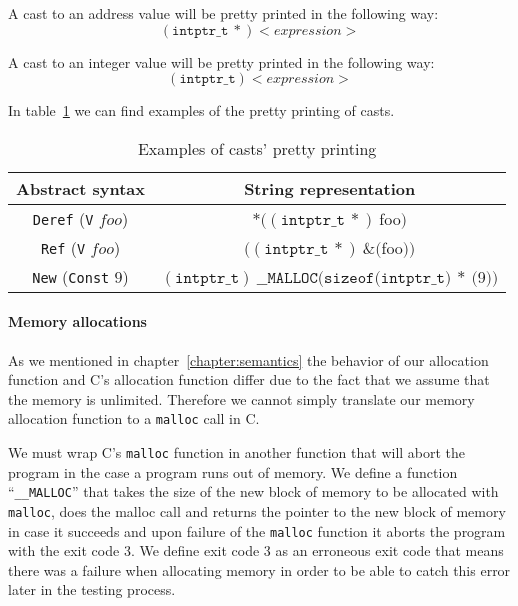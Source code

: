 A cast to an address value will be pretty printed in the following way:
\begin{equation*}
(\mathtt{intptr\_t}\ *) <expression>
\end{equation*}

A cast to an integer value will be pretty printed in the following way:
\begin{equation*}
(\mathtt{intptr\_t}) <expression>
\end{equation*}

In table~\ref{tab:pretty_casts} we can find examples of the pretty printing of casts.

\begin{table}[h!]
\centering
\begin{tabular}{|c|c|}
  \hline
  \textbf{Abstract syntax} & \textbf{String representation} \\ [0.5ex]
  \hline \hline
  \verb|Deref| (\verb|V| $foo$) & $*((\mathtt{intptr\_t}\ *)\ $foo$)$ \\
  \verb|Ref| (\verb|V| $foo$)   & $((\mathtt{intptr\_t}\ *)\ \&($foo$))$ \\
  \verb|New| (\verb|Const| $9$) & $(\mathtt{intptr\_t})\ \mathtt{\_\_MALLOC}(\mathtt{sizeof}(\mathtt{intptr\_t)}\ *\ ($9$))$ \\
  \hline
\end{tabular}

\caption{Examples of casts' pretty printing}
\label{tab:pretty_casts}
\end{table}


\paragraph{Memory allocations}

As we mentioned in chapter~\ref{chapter:semantics} the behavior of our allocation function and C's allocation function differ due to the fact that we assume that the memory is unlimited.
Therefore we cannot simply translate our memory allocation function to a \verb|malloc| call in C.

We must wrap C's \verb|malloc| function in another function that will abort the program in the case a program runs out of memory.
We define a function ``\verb|__MALLOC|'' that takes the size of the new block of memory to be allocated with \verb|malloc|, does the malloc call and returns the pointer to the new block of memory in case it succeeds and upon failure of the \verb|malloc| function it aborts the program with the exit code 3.
We define exit code 3 as an erroneous exit code that means there was a failure when allocating memory in order to be able to catch this error later in the testing process.




